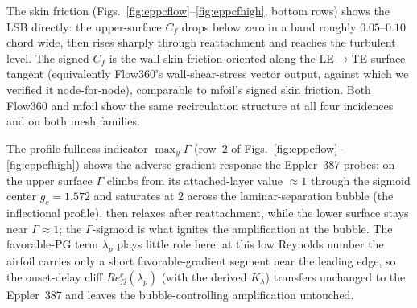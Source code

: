 \documentclass[journal]{new-aiaa}
\begin{document}
The skin friction (Figs.~\ref{fig:eppcflow}--\ref{fig:eppcfhigh}, bottom rows)
shows the LSB directly: the upper-surface $C_f$ drops below zero in a band
roughly $0.05$--$0.10$ chord wide, then
rises sharply through reattachment and reaches the turbulent level. The signed
$C_f$ is the wall skin friction oriented along the LE$\to$TE surface tangent
(equivalently Flow360's wall-shear-stress vector output, against which we verified
it node-for-node), comparable to mfoil's signed skin friction. Both Flow360
and mfoil show the same recirculation structure at all four incidences and on
both mesh families.

The profile-fullness indicator $\max_y\Gamma$ (row~2 of
Figs.~\ref{fig:eppcflow}--\ref{fig:eppcfhigh}) shows the adverse-gradient
response the Eppler~387 probes: on the upper surface $\Gamma$ climbs from
its attached-layer value $\approx\!1$ through the sigmoid center
$g_c\!=\!1.572$ and saturates at $2$ across the laminar-separation bubble (the
inflectional profile), then relaxes after reattachment, while the lower surface
stays near $\Gamma\!\approx\!1$; the $\Gamma$-sigmoid is what ignites the
amplification at the bubble. The favorable-PG term $\lambda_p$ plays little role
here: at this low Reynolds number the airfoil carries only a short
favorable-gradient segment near the leading edge, so the onset-delay cliff
$Re_\Omega^{\mathrm{c}}(\lambda_p)$ (with the derived $K_\lambda$) transfers
unchanged to the Eppler~387 and leaves the bubble-controlling amplification
untouched.
\end{document}
